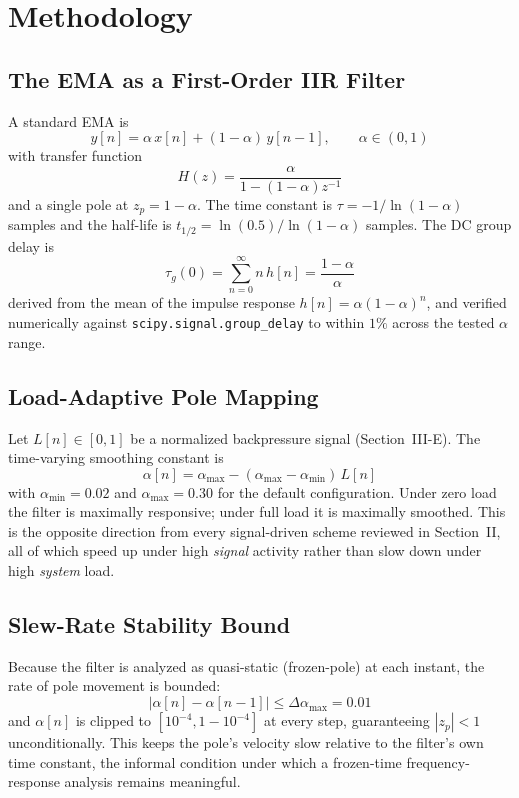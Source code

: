 \documentclass[conference]{IEEEtran}
\begin{document}
\section{Methodology}

\subsection{The EMA as a First-Order IIR Filter}
A standard EMA is
\begin{equation}
y[n] = \alpha\,x[n] + (1-\alpha)\,y[n-1], \qquad \alpha\in(0,1)
\label{eq:ema}
\end{equation}
with transfer function
\begin{equation}
H(z) = \frac{\alpha}{1-(1-\alpha)z^{-1}}
\label{eq:hz}
\end{equation}
and a single pole at $z_p = 1-\alpha$. The time constant is
$\tau = -1/\ln(1-\alpha)$ samples and the half-life is
$t_{1/2} = \ln(0.5)/\ln(1-\alpha)$ samples. The DC group delay is
\begin{equation}
\tau_g(0) = \sum_{n=0}^{\infty} n\,h[n] = \frac{1-\alpha}{\alpha}
\label{eq:gd}
\end{equation}
derived from the mean of the impulse response $h[n]=\alpha(1-\alpha)^n$,
and verified numerically against \texttt{scipy.signal.group\_delay} to within
$1\%$ across the tested $\alpha$ range.

\subsection{Load-Adaptive Pole Mapping}
Let $L[n]\in[0,1]$ be a normalized backpressure signal (Section~III-E).
The time-varying smoothing constant is
\begin{equation}
\alpha[n] = \alpha_\text{max} - (\alpha_\text{max}-\alpha_\text{min})\,L[n]
\label{eq:alphamapping}
\end{equation}
with $\alpha_\text{min}=0.02$ and $\alpha_\text{max}=0.30$ for the
default configuration. Under zero load the filter is maximally responsive;
under full load it is maximally smoothed. This is the opposite direction
from every signal-driven scheme reviewed in Section~II, all of which speed
up under high \emph{signal} activity rather than slow down under high
\emph{system} load.

\subsection{Slew-Rate Stability Bound}
Because the filter is analyzed as quasi-static (frozen-pole) at each instant,
the rate of pole movement is bounded:
\begin{equation}
|\alpha[n]-\alpha[n-1]| \le \Delta\alpha_\text{max} = 0.01
\label{eq:slew}
\end{equation}
and $\alpha[n]$ is clipped to $[10^{-4},1-10^{-4}]$ at every step,
guaranteeing $|z_p|<1$ unconditionally. This keeps the pole's velocity slow
relative to the filter's own time constant, the informal condition under which
a frozen-time frequency-response analysis remains meaningful.
\end{document}
